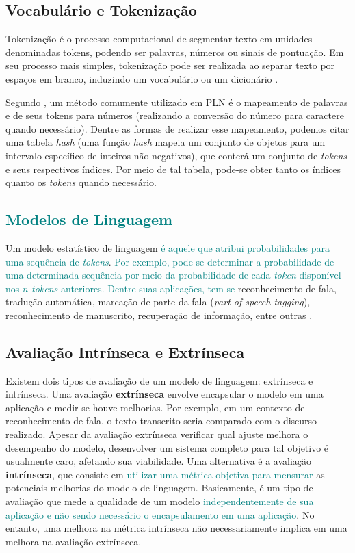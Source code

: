 \documentclass{automatextcc}
\newcommand{\nico}[1]{\textcolor{teal}{#1}}
\begin{document}
\subsection{Vocabulário e Tokenização}
Tokenização é o processo computacional de segmentar texto em unidades denominadas tokens, podendo ser palavras, números ou sinais de pontuação. Em seu processo mais simples, tokenização pode ser realizada ao separar texto por espaços em branco, induzindo um vocabulário ou um dicionário \citep{kamath2019, jurafsky2021}.

Segundo \citet{manning1999}, um método comumente utilizado em PLN é o mapeamento de palavras e de seus tokens para números (realizando a conversão do número para caractere quando necessário). Dentre as formas de realizar esse mapeamento, podemos citar uma tabela \textit{hash} (uma função \textit{hash} mapeia um conjunto de objetos para um intervalo específico de inteiros não negativos), que conterá um conjunto de \textit{tokens} e seus respectivos índices. Por meio de tal tabela, pode-se obter tanto os índices quanto os \textit{tokens} quando necessário.



\subsection{\nico{Modelos de Linguagem}}
Um modelo estatístico de linguagem \nico{é aquele que atribui probabilidades para uma sequência de \textit{tokens}}. \nico{Por exemplo, pode-se determinar a probabilidade de uma determinada sequência por meio da probabilidade de cada \textit{token} disponível nos $n$ \textit{tokens} anteriores. Dentre suas aplicações, tem-se} reconhecimento de fala, tradução automática, marcação de parte da fala (\textit{part-of-speech tagging}), reconhecimento de manuscrito, recuperação de informação, entre outras
\citep{kamath2019, jurafsky2021}.




\subsection{Avaliação Intrínseca e Extrínseca}
Existem dois tipos de avaliação de um modelo de linguagem: extrínseca e intrínseca. Uma avaliação \textbf{extrínseca} envolve encapsular o modelo em uma aplicação e medir se houve melhorias. Por exemplo, em um contexto de reconhecimento de fala, o texto transcrito seria comparado com o discurso realizado. Apesar da avaliação extrínseca verificar qual ajuste melhora o desempenho do modelo, desenvolver um sistema completo para tal objetivo é usualmente caro, afetando sua viabilidade. Uma alternativa é a avaliação \textbf{intrínseca}, que consiste em \nico{utilizar uma métrica objetiva para mensurar} as potenciais melhorias do modelo de linguagem. Basicamente, é um tipo de avaliação que mede a qualidade de um modelo \nico{independentemente de sua aplicação e não sendo necessário o encapsulamento em uma aplicação}. No entanto, uma melhora na métrica intrínseca não necessariamente implica em uma melhora na avaliação extrínseca. 
\end{document}
